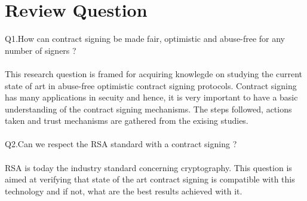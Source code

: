 \section{Review Question}
Q1.How can contract signing be made fair, optimistic and abuse-free for any number of signers ?
\\
\\This research question is framed for acquiring  knowlegde on studying the current state of art in abuse-free optimistic contract signing protocols. Contract signing has many applications in secuity and hence, it is very important to have a basic understanding of the contract signing mechanisms. The steps followed, actions taken and trust mechanisms are gathered from the exising studies.    
\\
\\Q2.Can we respect the RSA standard with a contract signing ?\\
\\
RSA is today the industry standard concerning cryptography. This question is aimed at verifying that state of the art contract signing is compatible with this technology and if not, what are the best results achieved with it. 
